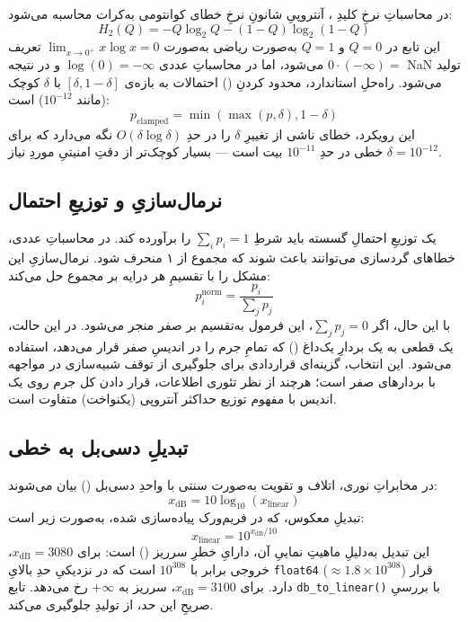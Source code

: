 در محاسباتِ نرخِ کلیدِ ، آنتروپیِ شانونِ نرخِ خطای کوانتومی به‌کرات محاسبه می‌شود:
\begin{equation}
	H_2(Q) = -Q \log_2 Q - (1-Q) \log_2(1-Q)
\end{equation}
این تابع در $Q = 0$ و $Q = 1$ به‌صورت ریاضی به‌صورت $\lim_{x \to 0^+} x \log x = 0$ تعریف می‌شود، اما در محاسباتِ عددی $\log(0) = -\infty$ و در نتیجه $0 \cdot (-\infty) = $ NaN تولید می‌شود. راه‌حلِ استاندارد، محدود کردنِ () احتمالات به بازه‌ی $[\delta, 1 - \delta]$ با $\delta$ کوچک (مانند $10^{-12}$) است:
\begin{equation}
	p_{\text{clamped}} = \min(\max(p, \delta), 1 - \delta)
\end{equation}
این رویکرد، خطای ناشی از تغییرِ $\delta$ را در حدِ $O(\delta \log \delta)$ نگه می‌دارد که برای $\delta = 10^{-12}$ خطی در حدِ $10^{-11}$ بیت است — بسیار کوچک‌تر از دقتِ امنیتیِ موردِ نیاز.

\subsection{نرمال‌سازیِ  و توزیعِ احتمال}

یک توزیعِ احتمالِ گسسته باید شرطِ $\sum_i p_i = 1$ را برآورده کند. در محاسباتِ عددی، خطاهای گردسازی می‌توانند باعث شوند که مجموع از ۱ منحرف شود. نرمال‌سازیِ  این مشکل را با تقسیمِ هر درایه بر مجموع حل می‌کند:
\begin{equation}
	p_i^{\text{norm}} = \frac{p_i}{\sum_j p_j}
\end{equation}
با این حال، اگر $\sum_j p_j = 0$، این فرمول به‌تقسیم بر صفر منجر می‌شود. در این حالت، یک  قطعی به یک بردارِ یک‌داغ () که تمامِ جرم را در اندیسِ صفر قرار می‌دهد، استفاده می‌شود. این انتخاب، گزینه‌ای قراردادی برای جلوگیری از توقف شبیه‌سازی در مواجهه با بردارهای صفر است؛ هرچند از نظر تئوری اطلاعات، قرار دادن کل جرم روی یک اندیس با مفهوم توزیع حداکثر آنتروپی (یکنواخت) متفاوت است.

\subsection{تبدیلِ دسی‌بل به خطی}

در مخابراتِ نوری، اتلاف و تقویت به‌صورت سنتی با واحدِ دسی‌بل () بیان می‌شوند:
\begin{equation}
	x_{\text{dB}} = 10 \log_{10}(x_{\text{linear}})
\end{equation}
تبدیلِ معکوس، که در فریم‌ورک پیاده‌سازی شده، به‌صورت زیر است:
\begin{equation}
	x_{\text{linear}} = 10^{x_{\text{dB}}/10}
\end{equation}
این تبدیل به‌دلیلِ ماهیتِ نماییِ آن، دارایِ خطرِ سرریز () است: برای $x_{\text{dB}} = 3080$، خروجی برابر با $10^{308}$ است که در نزدیکیِ حدِ بالایِ \texttt{float64} ($\approx 1.8 \times 10^{308}$) قرار دارد. برای $x_{\text{dB}} = 3100$، سرریز به $+\infty$ رخ می‌دهد. تابع \texttt{db\_to\_linear()} با بررسیِ صریحِ این حد، از تولیدِ  جلوگیری می‌کند.


